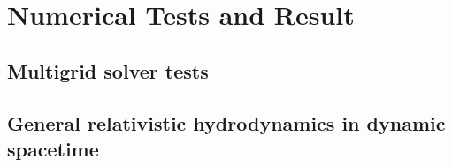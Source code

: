 
\chapter{Numerical Tests and Result}  %

\ifpdf
    \graphicspath{{Chapter4/Figs/PDF/}{Chapter4/Figs/}}
\else
    \graphicspath{{Chapter4/Figs/}}
\fi


\section{Multigrid solver tests} %
\label{section4.1}

\section{General relativistic hydrodynamics in dynamic spacetime} %
\label{section4.2}

